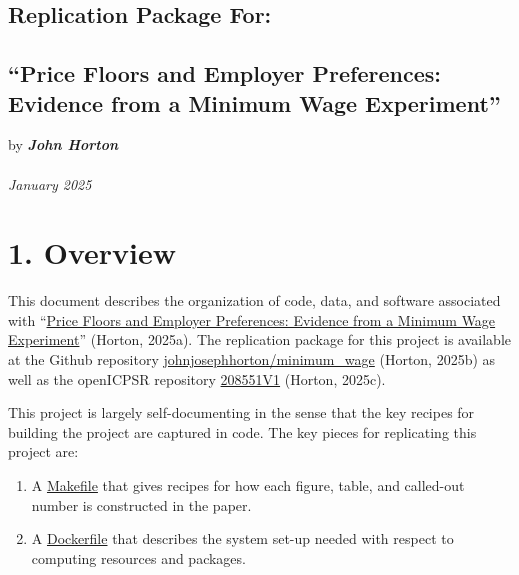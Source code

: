 \documentclass[10pt]{article}
\begin{document}
\begin{center}
\section*{Replication Package For:}
\subsection*{``Price Floors and Employer Preferences: \\ Evidence from a Minimum Wage Experiment''}
by \textit{\textbf{John Horton}} \\~\\

\textit{January 2025}

\end{center}

\vspace{1em}
\section*{1. Overview}

This document describes the organization of code, data, and software associated with ``\href{https://www.aeaweb.org/articles?id=10.1257/aer.20170637}{Price Floors and Employer Preferences: Evidence from a Minimum Wage Experiment}'' (Horton, 2025a).
The replication package for this project is available at the Github repository \href{https://www.github.com/johnjosephhorton/minimum\_wage.git}{johnjosephhorton/minimum\_wage} (Horton, 2025b) as well as the openICPSR repository \href{http://doi.org/10.3886/E208551V1}{208551V1} (Horton, 2025c).

This project is largely self-documenting in the sense that the key recipes for building the project are captured in code. 
The key pieces for replicating this project are: 

\begin{enumerate}
    \item A \href{https://www.github.com/johnjosephhorton/minimum\_wage/blob/main/writeup/Makefile}{Makefile} that gives recipes for how each figure, table, and called-out number is constructed in the paper.
    \item A \href{https://www.github.com/johnjosephhorton/minimum\_wage/blob/main/writeup/Dockerfile}{Dockerfile} that describes the system set-up needed with respect to computing resources and packages.
\end{enumerate}
\end{document}
